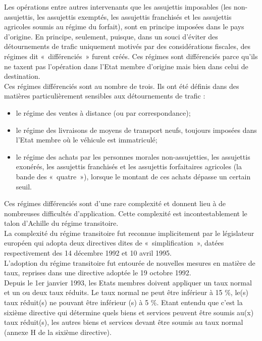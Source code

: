 \documentclass{book}
\begin{document}
Les opérations entre autres intervenants que les assujettis imposables (les non-assujettis, les
assujettis exemptés, les assujettis franchisés et les assujettis agricoles soumis au régime du
forfait), sont en principe imposées dans le pays d'origine. En principe, seulement, puisque,
dans un souci d'éviter des détournements de trafic uniquement motivés par des considérations
fiscales, des régimes dit «~différenciés~» furent créés. Ces régimes sont différenciés parce
qu'ils ne taxent pas l'opération dans l'Etat membre d'origine mais bien dans celui de
destination.\\

Ces régimes différenciés sont au nombre de trois. Ils ont été définis dans des matières
particulièrement sensibles aux détournements de trafic :\\

\begin{itemize}
\item le régime des ventes à distance (ou par correspondance);
\item le régime des livraisons de moyens de transport neufs, toujours imposées dans
l'Etat membre où le véhicule est immatriculé;
\item le régime des achats par les personnes morales non-assujetties, les assujettis
exonérés, les assujettis franchisés et les assujettis forfaitaires agricoles (la bande
des «~quatre~»), lorsque le montant de ces achats dépasse un certain seuil.

\end{itemize}

\null

Ces régimes différenciés sont d'une rare complexité et donnent lieu à de nombreuses
difficultés d'application. Cette complexité est incontestablement le talon d'Achille du régime
transitoire.\\

La complexité du régime transitoire fut reconnue implicitement par le législateur européen qui
adopta deux directives dites de «~simplification~», datées respectivement des 14 décembre
1992 et 10 avril 1995.\\

L'adoption du régime transitoire fut entourée de nouvelles mesures en matière de taux,
reprises dans une directive adoptée le 19 octobre 1992.\\

Depuis le 1er janvier 1993, les Etats membres doivent appliquer un taux normal et un ou deux
taux réduits. Le taux normal ne peut être inférieur à 15 \%, le(s) taux réduit(s) ne pouvant être
inférieur (s) à 5 \%. Etant entendu que c’est la sixième directive qui détermine quels biens et
services peuvent être soumis au(x) taux réduit(s), les autres biens et services devant être
soumis au taux normal (annexe H de la sixième directive).\\
\end{document}

